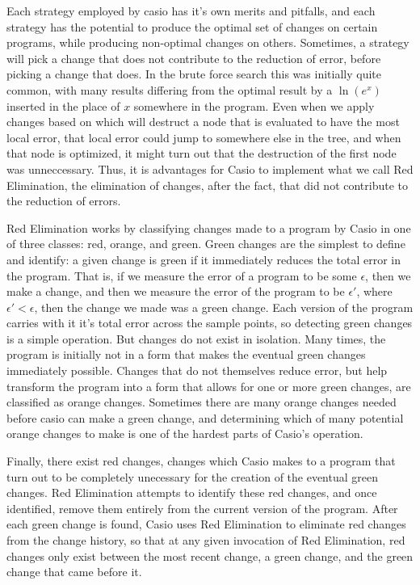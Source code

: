 \documentclass{article}
\newcommand{\lnexp}[1]{\ln{\left(e^{#1}\right)}}
\begin{document}
Each strategy employed by casio 
has it's own merits and pitfalls, 
and each strategy has the potential 
to produce the optimal set of changes on certain programs, 
while producing non-optimal changes on others. 
Sometimes, a strategy will pick a change 
that does not contribute to the reduction of error, 
before picking a change that does. 
In the brute force search this was initially quite common, 
with many results differing from the optimal result 
by a $\lnexp{x}$ inserted in the place of $x$ 
somewhere in the program. 
Even when we apply changes based on which will destruct a node 
that is evaluated to have the most local error, 
that local error could jump to somewhere else in the tree, 
and when that node is optimized, 
it might turn out that the destruction of the first node was unneccessary. 
Thus, it is advantages for Casio 
to implement what we call Red Elimination, 
the elimination of changes, after the fact, 
that did not contribute to the reduction of errors.

Red Elimination works by classifying changes made to a program by Casio in one of three classes: 
red, orange, and green. 
Green changes are the simplest to define and identify: 
a given change is green if it immediately reduces the total error in the program. 
That is, if we measure the error of a program to be some $\epsilon$, 
then we make a change, 
and then we measure the error of the program to be $\epsilon'$, 
where $\epsilon' < \epsilon$, 
then the change we made was a green change. 
Each version of the program carries with it 
it's total error across the sample points, 
so detecting green changes is a simple operation. 
But changes do not exist in isolation. 
Many times, the program is initially not in a form 
that makes the eventual green changes immediately possible. 
Changes that do not themselves reduce error, 
but help transform the program into a form 
that allows for one or more green changes, 
are classified as orange changes. 
Sometimes there are many orange changes needed 
before casio can make a green change, 
and determining which of many potential orange changes 
to make is one of the hardest parts of Casio's operation.

Finally, there exist red changes, 
changes which Casio makes to a program 
that turn out to be completely unecessary 
for the creation of the eventual green changes. 
Red Elimination attempts to identify these red changes, 
and once identified, 
remove them entirely from the current version of the program. 
After each green change is found, 
Casio uses Red Elimination to eliminate red changes from the change history, 
so that at any given invocation of Red Elimination, 
red changes only exist between the most recent change, 
a green change,
and the green change that came before it.
\end{document}
